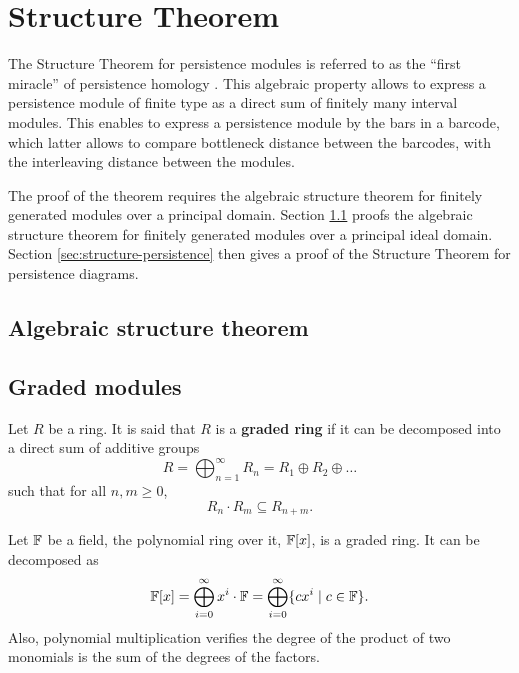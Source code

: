 \chapter{Structure Theorem} \label{chap:structure}
The Structure Theorem for persistence modules is referred to as the ``first miracle'' of persistence homology \cite{nanda}. This algebraic property allows to express a persistence module of finite type as a direct sum of finitely many interval modules. This enables to express a persistence module by the bars in a barcode, which latter allows to compare bottleneck distance between the barcodes, with the interleaving distance between the modules.

The proof of the theorem requires the algebraic structure theorem for finitely generated modules over a principal domain. Section \ref{sec:structure-algebraic} proofs the algebraic structure theorem for finitely generated modules over a principal ideal domain. Section \ref{sec:structure-persistence} then gives a proof of the Structure Theorem for persistence diagrams.

\section{Algebraic structure theorem} \label{sec:structure-algebraic}

\section{Graded modules} \label{sec:preliminaries-persistence-modules}

\begin{definition}
    Let $ R $ be a ring. It is said that $ R $ is a {\bf graded ring} if it can be decomposed into a direct sum of additive groups
    \begin{equation}
        R = \bigoplus_{n=1}^{\infty} R_n = R_1 \oplus R_2 \oplus \dots
    \end{equation}
    such that for all $ n, m \geq 0 $, 
    \begin{equation}
        R_n \cdot R_m \subseteq R_{n+m}.
    \end{equation}
\end{definition}

\begin{example} \label{ex:graded-ring}
    Let $ \mathbb F $ be a field, the polynomial ring over it, $ \mathbb F[x] $, is a graded ring. It can be decomposed as
    \begin{equation}
        \mathbb F[x] = \bigoplus_{i=0}^\infty x^i \cdot \mathbb F = \bigoplus_{i=0}^\infty \{c x^i \mid c \in \mathbb F\}.
    \end{equation}
    Also, polynomial multiplication verifies the degree of the product of two monomials is the sum of the degrees of the factors.
\end{example}

